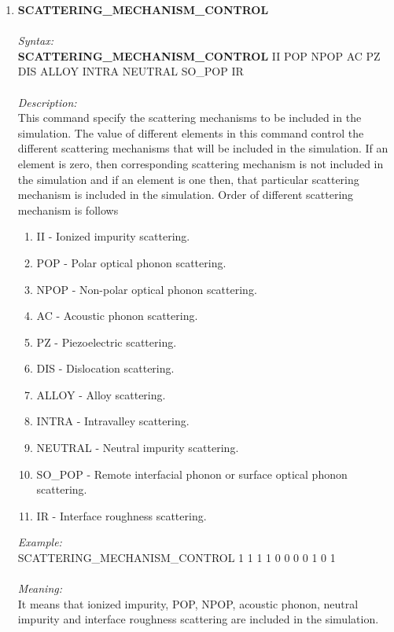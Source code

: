 \documentclass[12pt]{article}
\begin{document}
\begin{enumerate}
    \item \textbf{SCATTERING\_MECHANISM\_CONTROL}  \\ \\
    \textit{Syntax:} \\
    \textbf{SCATTERING\_MECHANISM\_CONTROL} II POP NPOP AC PZ DIS ALLOY INTRA NEUTRAL SO\_POP IR \\ \\
    \textit{Description:} \\
    This command specify the scattering mechanisms to be included in the simulation. The value of different elements in this command control the different scattering mechanisms that will be included in the simulation. If an element is zero, then corresponding scattering mechanism is not included in the simulation and if an element is one then, that particular scattering mechanism is included in the simulation. Order of different scattering mechanism is follows 
    \begin{enumerate}
        \item II - Ionized impurity scattering.
        \item POP - Polar optical phonon scattering.
        \item NPOP - Non-polar optical phonon scattering.
        \item AC - Acoustic phonon scattering.
        \item PZ - Piezoelectric scattering.
        \item DIS - Dislocation scattering.
        \item ALLOY - Alloy scattering.
        \item INTRA - Intravalley scattering.
        \item NEUTRAL - Neutral impurity scattering. 
        \item SO\_POP - Remote interfacial phonon or surface optical phonon scattering.
        \item IR - Interface roughness scattering.
    \end{enumerate}

    \textit{Example:} \\
    SCATTERING\_MECHANISM\_CONTROL 1 1 1 1 0 0 0 0 1 0 1 \\ \\
    \textit{Meaning:} \\    
    It means that ionized impurity, POP, NPOP, acoustic phonon, neutral impurity and interface roughness scattering are included in the simulation. \\ \\
    

\end{enumerate}
\end{document}
